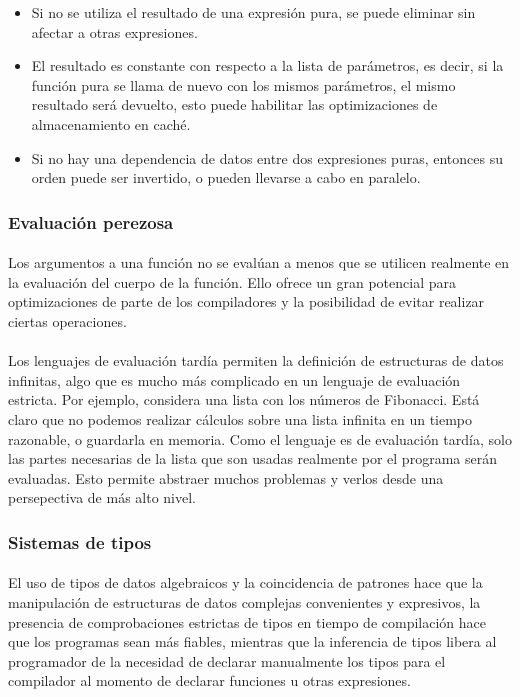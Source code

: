 \documentclass{standalone}
\begin{document}
\begin{itemize}
\item Si no se utiliza el resultado de una expresión pura, se puede eliminar sin afectar a otras expresiones.
\item El resultado es constante con respecto a la lista de parámetros, es decir, si la función pura se llama de nuevo con los mismos parámetros, el mismo resultado será devuelto, esto puede habilitar las optimizaciones de almacenamiento en caché.
\item Si no hay una dependencia de datos entre dos expresiones puras, entonces su orden puede ser invertido, o pueden llevarse a cabo en paralelo.
\end{itemize}

\subsubsection{Evaluación perezosa}
\paragraph{}
Los argumentos a una función no se evalúan a menos que se utilicen realmente en la evaluación del cuerpo de la función. Ello ofrece un gran potencial para optimizaciones de parte de los compiladores y la posibilidad de evitar realizar ciertas operaciones.

\paragraph{}
Los lenguajes de evaluación tardía permiten la definición de estructuras de datos infinitas, algo que es mucho más complicado en un lenguaje de evaluación estricta. Por ejemplo, considera una lista con los números de Fibonacci. Está claro que no podemos realizar cálculos sobre una lista infinita en un tiempo razonable, o guardarla en memoria. Como el lenguaje es de evaluación tardía, solo las partes necesarias de la lista que son usadas realmente por el programa serán evaluadas. Esto permite abstraer muchos problemas y verlos desde una persepectiva de más alto nivel.

\subsubsection{Sistemas de tipos}
\paragraph{}
El uso de tipos de datos algebraicos y la coincidencia de patrones hace que la manipulación de estructuras de datos complejas convenientes y expresivos, la presencia de comprobaciones estrictas de tipos en tiempo de compilación hace que los programas sean más fiables, mientras que la inferencia de tipos libera al programador de la necesidad de declarar manualmente los tipos para el compilador al momento de declarar funciones u otras expresiones.
\end{document}
